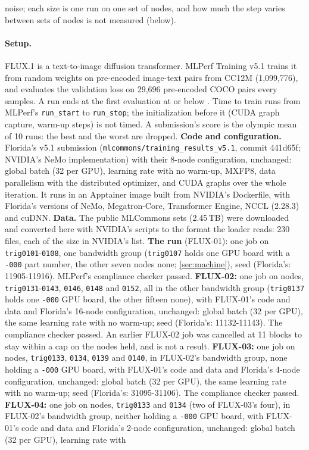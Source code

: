 noise; each size is one run on one set of nodes, and how much the step varies between sets of nodes is not measured (below).

\paragraph{Setup.} FLUX.1 is a text-to-image diffusion transformer. MLPerf Training v5.1 trains it from random weights on pre-encoded image-text pairs from CC12M (1,099,776), and evaluates the validation loss on 29,696 pre-encoded COCO pairs every \TriFxBlockSamples{} samples. A run ends at the first evaluation at or below \TriFxTarget. Time to train runs from MLPerf's \texttt{run\_start} to \texttt{run\_stop}; the initialization before it (CUDA graph capture, warm-up steps) is not timed. A submission's score is the olympic mean of 10 runs: the best and the worst are dropped. \textbf{Code and configuration.} Florida's v5.1 submission (\texttt{mlcommons/training\_results\_v5.1}, commit 441d65f; NVIDIA's NeMo implementation) with their 8-node configuration, unchanged: global batch \TriFxGbs{} (32 per GPU), learning rate \TriFxLr{} with no warm-up, MXFP8, data parallelism with the distributed optimizer, and CUDA graphs over the whole iteration. It runs in an Apptainer image built from NVIDIA's Dockerfile, with Florida's versions of NeMo, Megatron-Core, Transformer Engine, NCCL (2.28.3) and cuDNN. \textbf{Data.} The public MLCommons sets (2.45\,TB) were downloaded and converted here with NVIDIA's scripts to the format the loader reads: 230 files, each of the size in NVIDIA's list. \textbf{The run} (FLUX-01): one job on \texttt{trig0101}-\texttt{0108}, one bandwidth group (\texttt{trig0107} holds one GPU board with a \texttt{-000} part number, the other seven nodes none; \cref{sec:machine}), seed \TriFxSeed{} (Florida's: 11905-11916). MLPerf's compliance checker passed. \textbf{FLUX-02:} one job on \TriFxSixteenNodes{} nodes, \texttt{trig0131}-\texttt{0143}, \texttt{0146}, \texttt{0148} and \texttt{0152}, all in the other bandwidth group (\texttt{trig0137} holds one \texttt{-000} GPU board, the other fifteen none), with FLUX-01's code and data and Florida's 16-node configuration, unchanged: global batch \TriFxSixteenGbs{} (32 per GPU), the same learning rate with no warm-up; seed \TriFxSixteenSeed{} (Florida's: 11132-11143). The compliance checker passed. An earlier FLUX-02 job was cancelled at 11 blocks to stay within a cap on the nodes held, and is not a result. \textbf{FLUX-03:} one job on \TriFxFourNodes{} nodes, \texttt{trig0133}, \texttt{0134}, \texttt{0139} and \texttt{0140}, in FLUX-02's bandwidth group, none holding a \texttt{-000} GPU board, with FLUX-01's code and data and Florida's 4-node configuration, unchanged: global batch \TriFxFourGbs{} (32 per GPU), the same learning rate with no warm-up; seed \TriFxFourSeed{} (Florida's: 31095-31106). The compliance checker passed. \textbf{FLUX-04:} one job on \TriFxTwoNodes{} nodes, \texttt{trig0133} and \texttt{0134} (two of FLUX-03's four), in FLUX-02's bandwidth group, neither holding a \texttt{-000} GPU board, with FLUX-01's code and data and Florida's 2-node configuration, unchanged: global batch \TriFxTwoGbs{} (32 per GPU), learning rate \TriFxTwoLr{} with 